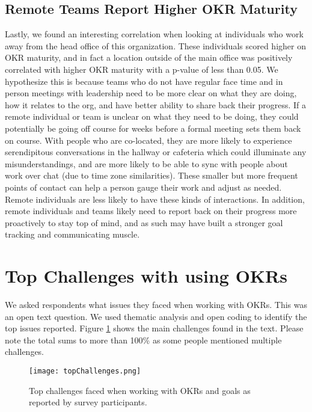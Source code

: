 \documentclass[sigconf, nonacm]{acmart}
\begin{document}
\subsection{Remote Teams Report Higher OKR Maturity}
Lastly, we found an interesting correlation when looking at individuals who work away from the head office of this organization. These individuals scored higher on OKR maturity, and in fact a location outside of the main office was positively correlated with higher OKR maturity with a p-value of less than 0.05. We hypothesize this is because teams who do not have regular face time and in person meetings with leadership need to be more clear on what they are doing, how it relates to the org, and have better ability to share back their progress. If a remote individual or team is unclear on what they need to be doing, they could potentially be going off course for weeks before a formal meeting sets them back on course. With people who are co-located, they are more likely to experience serendipitous conversations in the hallway or cafeteria which could illuminate any misunderstandings, and are more likely to be able to sync with people about work over chat (due to time zone similarities). These smaller but more frequent points of contact can help a person gauge their work and adjust as needed. Remote individuals are less likely to have these kinds of interactions. In addition, remote individuals and teams likely need to report back on their progress more proactively to stay top of mind, and as such may have built a stronger goal tracking and communicating muscle. 


\section{Top Challenges with using OKRs}
\label{sec:challenges}

We asked respondents what issues they faced when working with OKRs. This was an open text question. We used thematic analysis and open coding to identify the top issues reported. Figure \ref{fig:topChallenges} shows the main challenges found in the text. Please note the total sums to more than 100\% as some people mentioned multiple challenges.

\begin{figure}
\texttt{[image: topChallenges.png]}
\caption{Top challenges faced when working with OKRs and goals as reported by survey participants.}
\label{fig:topChallenges}
\end{figure}
\end{document}

